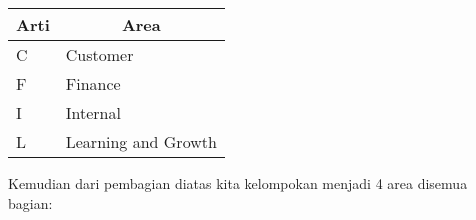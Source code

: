 \documentclass[conference]{IEEEtran}
\begin{document}
\begin{table}[h]

 \begin{tabular}{|l|l|}
\hline
\multicolumn{1}{|c|}{Arti} & \multicolumn{1}{c|}{Area} \\ \hline
C                          & Customer                  \\ \hline
F                          & Finance                   \\ \hline
I                          & Internal                  \\ \hline
L                          & Learning and Growth       \\ \hline
\end{tabular}

\end{table}



\text Kemudian dari pembagian diatas kita kelompokan menjadi 4 area disemua bagian:

\centering
{} \label{tab:title} 
\end{document}

